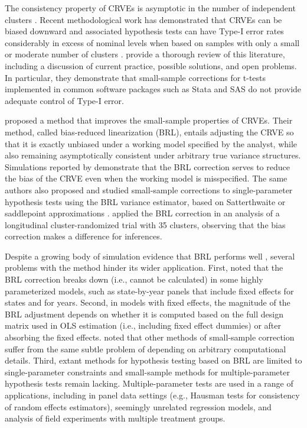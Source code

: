 \documentclass[draft]{ectaart}\usepackage[]{graphicx}\usepackage[]{color}
\begin{document}
The consistency property of CRVEs is asymptotic in the number of independent clusters \citep{Wooldridge2003cluster}.
Recent methodological work has demonstrated that CRVEs can be biased downward and associated hypothesis tests can have Type-I error rates considerably in excess of nominal levels when based on samples with only a small or moderate number of clusters \citep[e.g.,][]{Webb2013wild}.
\citet{Cameron2015practitioners} provide a thorough review of this literature, including a discussion of current practice, possible solutions, and open problems. 
In particular, they demonstrate that small-sample corrections for t-tests implemented in common software packages such as Stata and SAS do not provide adequate control of Type-I error. 

\citet[see also \citealp{McCaffrey2001generalizations}]{Bell2002bias} proposed a method that improves the small-sample properties of CRVEs. 
Their method, called bias-reduced linearization (BRL), entails adjusting the CRVE so that it is exactly unbiased under a working model specified by the analyst, while also remaining asymptotically consistent under arbitrary true variance structures. 
Simulations reported by \citet{Bell2002bias} demonstrate that the BRL correction serves to reduce the bias of the CRVE even when the working model is misspecified. 
The same authors also proposed and studied small-sample corrections to single-parameter hypothesis tests using the BRL variance estimator, based on Satterthwaite \citep{Bell2002bias} or saddlepoint approximations \citep{McCaffrey2006improved}. 
\citet{Angrist2009effects} applied the BRL correction in an analysis of a longitudinal cluster-randomized trial with 35 clusters, observing that the bias correction makes a difference for inferences. 

Despite a growing body of simulation evidence that BRL performs well \citep[e.g.,][]{Imbens2015robust}, several problems with the method hinder its wider application. 
First, \citet{Angrist2009mostly} noted that the BRL correction breaks down (i.e., cannot be calculated) in some highly parameterized models, such as state-by-year panels that include fixed effects for states and for years.
Second, in models with fixed effects, the magnitude of the BRL adjustment depends on whether it is computed based on the full design matrix used in OLS estimation (i.e., including fixed effect dummies) or after absorbing the fixed effects. 
\citet{Cameron2015practitioners} noted that other methods of small-sample correction suffer from the same subtle problem of depending on arbitrary computational details.  
Third, extant methods for hypothesis testing based on BRL are limited to single-parameter constraints \citep{Bell2002bias, McCaffrey2006improved} and small-sample methods for multiple-parameter hypothesis tests remain lacking.
Multiple-parameter tests are used in a range of applications, including in panel data settings (e.g., Hausman tests for consistency of random effects estimators), seemingly unrelated regression models, and analysis of field experiments with multiple treatment groups.
\end{document}
